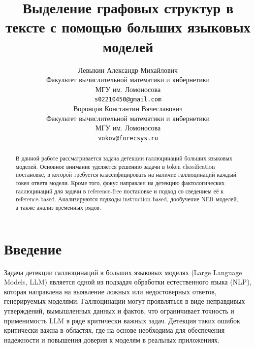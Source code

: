 \documentclass[12pt]{article}
\title{Выделение графовых структур в тексте с помощью больших языковых моделей}
\author{ Левыкин Александр Михайлович \\
        Факультет вычислительной математики и кибернетики \\
        МГУ им. Ломоносова \\
        \texttt{s02210450@gmail.com} \\
	\And
	Воронцов Константин Вячеславович \\
        Факультет вычислительной математики и кибернетики \\
        МГУ им. Ломоносова \\
        \texttt{vokov@forecsys.ru} \\
}
\date{}
\begin{document}
\maketitle

\begin{abstract}
В данной работе рассматривается задача детекции галлюцинаций больших языковых моделей. Основное внимание уделяется решению задачи в token classification постановке, в которой требуется классифицировать на наличие галлюцинаций каждый токен ответа модели. Кроме того, фокус направлен на детекцию фактологических галлюцинаций для задачи в reference-free постановке и подход со сведением её к reference-based. Анализируются подходы instruction-based, дообучение NER моделей, а также анализ временных рядов. %

%
\end{abstract}


\section{Введение}
Задача детекции галлюцинаций в больших языковых моделях (Large Language Models, LLM) является одной из подзадач обработки естественного языка (NLP), которая направлена на выявление ложных или недостоверных ответов, генерируемых моделями. Галлюцинации могут проявляться в виде неправдивых утверждений, вымышленных данных и фактов, что ограничивает точность и применимость LLM в ряде критически важных задач. Детекция таких ошибок критически важна в областях, где на основе необходима для обеспечения надежности и повышения доверия к моделям в реальных приложениях.
\end{document}
